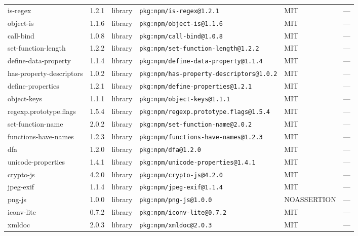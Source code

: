 \documentclass[11pt,a4paper]{article}
\begin{document}
\begin{longtable}{|p{4cm}|p{2cm}|p{1.6cm}|p{5cm}|p{1.5cm}|p{3.5cm}|}
\raggedright is-regex & 1.2.1 & library & \small\texttt{pkg:npm/is-regex@1.2.1} & MIT & \small — \\
\raggedright object-is & 1.1.6 & library & \small\texttt{pkg:npm/object-is@1.1.6} & MIT & \small — \\
\raggedright call-bind & 1.0.8 & library & \small\texttt{pkg:npm/call-bind@1.0.8} & MIT & \small — \\
\raggedright set-function-length & 1.2.2 & library & \small\texttt{pkg:npm/set-function-length@1.2.2} & MIT & \small — \\
\raggedright define-data-property & 1.1.4 & library & \small\texttt{pkg:npm/define-data-property@1.1.4} & MIT & \small — \\
\raggedright has-property-descriptors & 1.0.2 & library & \small\texttt{pkg:npm/has-property-descriptors@1.0.2} & MIT & \small — \\
\raggedright define-properties & 1.2.1 & library & \small\texttt{pkg:npm/define-properties@1.2.1} & MIT & \small — \\
\raggedright object-keys & 1.1.1 & library & \small\texttt{pkg:npm/object-keys@1.1.1} & MIT & \small — \\
\raggedright regexp.prototype.flags & 1.5.4 & library & \small\texttt{pkg:npm/regexp.prototype.flags@1.5.4} & MIT & \small — \\
\raggedright set-function-name & 2.0.2 & library & \small\texttt{pkg:npm/set-function-name@2.0.2} & MIT & \small — \\
\raggedright functions-have-names & 1.2.3 & library & \small\texttt{pkg:npm/functions-have-names@1.2.3} & MIT & \small — \\
\raggedright dfa & 1.2.0 & library & \small\texttt{pkg:npm/dfa@1.2.0} & MIT & \small — \\
\raggedright unicode-properties & 1.4.1 & library & \small\texttt{pkg:npm/unicode-properties@1.4.1} & MIT & \small — \\
\raggedright crypto-js & 4.2.0 & library & \small\texttt{pkg:npm/crypto-js@4.2.0} & MIT & \small — \\
\raggedright jpeg-exif & 1.1.4 & library & \small\texttt{pkg:npm/jpeg-exif@1.1.4} & MIT & \small — \\
\raggedright png-js & 1.0.0 & library & \small\texttt{pkg:npm/png-js@1.0.0} & NOASSERTION & \small — \\
\raggedright iconv-lite & 0.7.2 & library & \small\texttt{pkg:npm/iconv-lite@0.7.2} & MIT & \small — \\
\raggedright xmldoc & 2.0.3 & library & \small\texttt{pkg:npm/xmldoc@2.0.3} & MIT & \small — \\

\end{longtable}
\end{document}
